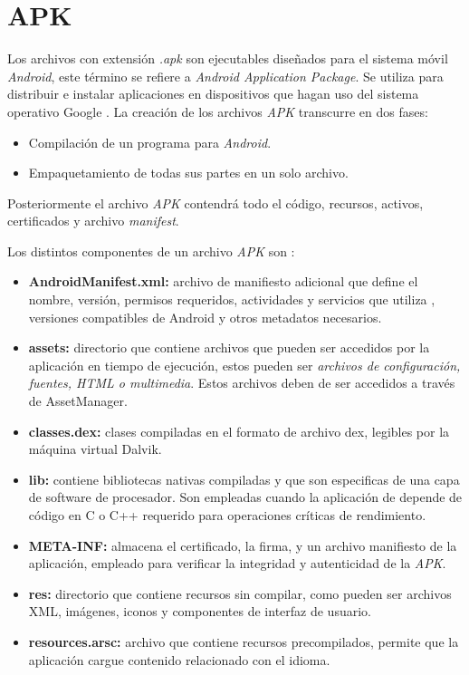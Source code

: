 \section{APK}
Los archivos con extensión \textit{.apk} son ejecutables diseñados para el sistema móvil \textit{Android}, este término se refiere a \textit{Android Application Package}. Se utiliza para distribuir e instalar aplicaciones en dispositivos que hagan uso del sistema operativo Google \cite{apk_xataka}.
La creación de los archivos \textit{APK} transcurre en dos fases:
\begin{itemize}
    \item Compilación de un programa para \textit{Android}.
    \item Empaquetamiento de todas sus partes en un solo archivo.
\end{itemize}
Posteriormente el archivo \textit{APK} contendrá todo el código, recursos, activos, certificados y archivo \textit{manifest}.

Los distintos componentes de un archivo \textit{APK} son \cite{apk_browserstack}\cite{apk_wikipedia}:
\begin{itemize}
    \item \textbf{AndroidManifest.xml:} archivo de manifiesto adicional que define el nombre, versión, permisos requeridos, actividades y servicios que utiliza , versiones compatibles de Android y otros metadatos necesarios.
    \item \textbf{assets:} directorio que contiene archivos que pueden ser accedidos por la aplicación en tiempo de ejecución, estos pueden ser \textit{archivos de configuración, fuentes, HTML o multimedia}. Estos archivos deben de ser accedidos a través de AssetManager.
    \item \textbf{classes.dex:} clases compiladas en el formato de archivo dex, legibles por la máquina virtual Dalvik.
    \item \textbf{lib:} contiene bibliotecas nativas compiladas y que son especificas de una capa de software de procesador. Son empleadas cuando la aplicación de depende de código en C o C++ requerido para operaciones críticas de rendimiento.
    \item \textbf{META-INF:} almacena el certificado, la firma, y un archivo manifiesto de la aplicación, empleado para verificar la integridad y autenticidad de la \textit{APK}.
    \item \textbf{res:} directorio que contiene recursos sin compilar, como pueden ser archivos XML, imágenes, iconos y componentes de interfaz de usuario.
    \item \textbf{resources.arsc:} archivo que contiene recursos precompilados, permite que la aplicación cargue contenido relacionado con el idioma.
\end{itemize}

